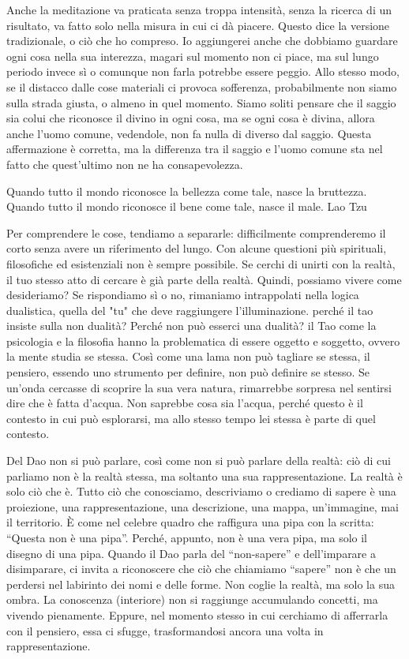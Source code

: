 \documentclass[12pt]{book} %
\begin{document}
Anche la meditazione va praticata senza troppa intensità, senza la ricerca di un risultato, va fatto solo nella misura in cui ci dà piacere. Questo dice la versione tradizionale, o ciò che ho compreso. Io aggiungerei anche che dobbiamo guardare ogni cosa nella sua interezza, magari sul momento non ci piace, ma sul lungo periodo invece sì o comunque non farla potrebbe essere peggio. Allo stesso modo, se il distacco dalle cose materiali ci provoca sofferenza, probabilmente non siamo sulla strada giusta, o almeno in quel momento.
Siamo soliti pensare che il saggio sia colui che riconosce il divino in ogni cosa, ma se ogni cosa è divina, allora anche l'uomo comune, vedendole, non fa nulla di diverso dal saggio. Questa affermazione è corretta, ma la differenza tra il saggio e l'uomo comune sta nel fatto che quest'ultimo non ne ha consapevolezza. 

Quando tutto il mondo riconosce la bellezza come tale, nasce la bruttezza.
Quando tutto il mondo riconosce il bene come tale, nasce il male.
Lao Tzu

Per comprendere le cose, tendiamo a separarle: difficilmente comprenderemo il corto senza avere un riferimento del lungo. Con alcune questioni più spirituali, filosofiche ed esistenziali non è sempre possibile. 
Se cerchi di unirti con la realtà, il tuo stesso atto di cercare è già parte della realtà. Quindi, possiamo vivere come desideriamo? Se rispondiamo sì o no, rimaniamo intrappolati nella logica dualistica, quella del "tu" che deve raggiungere l'illuminazione.
perché il tao insiste sulla non dualità? Perché non può esserci una dualità? il Tao come la psicologia e la filosofia hanno la problematica di essere oggetto e soggetto, ovvero la mente studia se stessa. 
Così come una lama non può tagliare se stessa, il pensiero, essendo uno strumento per definire, non può definire se stesso.
Se un'onda cercasse di scoprire la sua vera natura, rimarrebbe sorpresa nel sentirsi dire che è fatta d'acqua. Non saprebbe cosa sia l'acqua, perché questo è il contesto in cui può esplorarsi, ma allo stesso tempo lei stessa è parte di quel contesto.

Del Dao non si può parlare, così come non si può parlare della realtà: ciò di cui parliamo non è la realtà stessa, ma soltanto una sua rappresentazione.
La realtà è solo ciò che è. Tutto ciò che conosciamo, descriviamo o crediamo di sapere è una proiezione, una rappresentazione, una descrizione, una mappa, un'immagine, mai il territorio.
È come nel celebre quadro che raffigura una pipa con la scritta: “Questa non è una pipa”. Perché, appunto, non è una vera pipa, ma solo il disegno di una pipa.
Quando il Dao parla del “non-sapere” e dell’imparare a disimparare, ci invita a riconoscere che ciò che chiamiamo “sapere” non è che un perdersi nel labirinto dei nomi e delle forme. Non coglie la realtà, ma solo la sua ombra.
La conoscenza (interiore) non si raggiunge accumulando concetti, ma vivendo pienamente. Eppure, nel momento stesso in cui cerchiamo di afferrarla con il pensiero, essa ci sfugge, trasformandosi ancora una volta in rappresentazione. 
\end{document}

